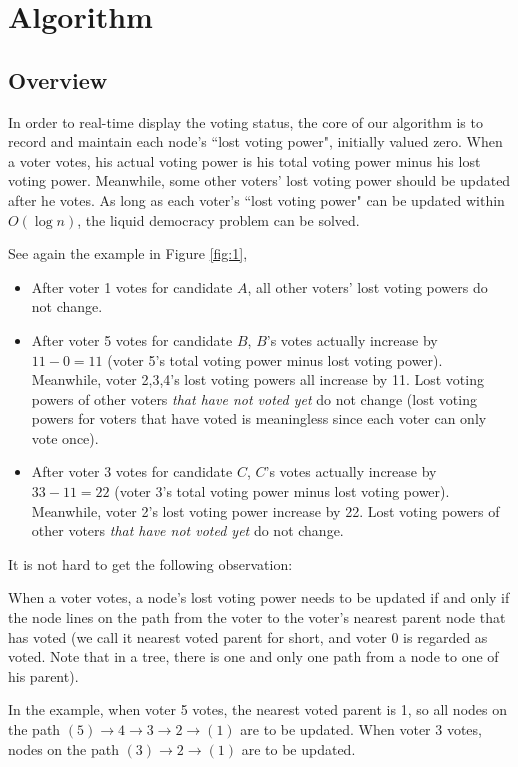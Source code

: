 \section{Algorithm}
\subsection{Overview}
In order to real-time display the voting status, the core of our algorithm is to record and maintain each node's ``lost voting power", initially valued zero. When a voter votes, his actual voting power is his total voting power minus his lost voting power. Meanwhile, some other voters' lost voting power should be updated after he votes. As long as each voter's ``lost voting power" can be updated within $O(\log n)$, the liquid democracy problem can be solved. 

See again the example in Figure \ref{fig:1}, 
\begin{itemize}
	\item After voter 1 votes for candidate $A$, all other voters' lost voting powers do not change. 
    \item After voter 5 votes for candidate $B$, $B$'s votes actually increase by $11-0=11$ (voter 5's total voting power minus lost voting power). Meanwhile, voter 2,3,4's lost voting powers all increase by 11. Lost voting powers of other voters {\em{that have not voted yet}} do not change  (lost voting powers for voters that  have voted is meaningless since each voter can only vote once).
    \item After voter 3 votes for candidate $C$, $C$'s votes actually increase by $33-11=22$ (voter 3's total voting power minus lost voting power). Meanwhile, voter 2's lost voting power increase by 22. Lost voting powers of other voters {\em{that have not voted yet}} do not change. 
\end{itemize}
It is not hard to get the following observation:
\begin{observation}
\label{obs:1}
	When a voter votes, a node's lost voting power needs to be updated if and only if the node lines on the path  from the voter to the voter's nearest parent node that has voted (we call it nearest voted parent for short, and voter 0 is regarded as voted. Note that in a tree, there is one and only one path from a node to one of his parent). 
\end{observation}
In the example, when voter 5 votes, the nearest voted parent is 1, so all nodes on the path $(5)\rightarrow4\rightarrow3\rightarrow2\rightarrow(1)$ are to be updated. When voter 3 votes, nodes on the path $(3)\rightarrow2\rightarrow(1)$ are to be updated. 

